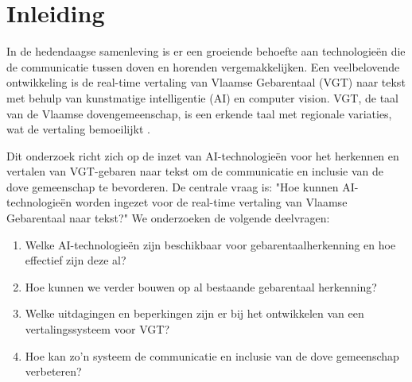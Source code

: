 


% 
\newcommand{\figref}[1]{(Zie \hyperref[#1]{figuur: \ref{#1}})}

\section{Inleiding}%
\label{sec:inleiding}

In de hedendaagse samenleving is er een groeiende behoefte aan technologieën die de communicatie tussen doven en horenden vergemakkelijken. Een veelbelovende ontwikkeling is de real-time vertaling van Vlaamse Gebarentaal (VGT) naar tekst met behulp van kunstmatige intelligentie (AI) en computer vision. VGT, de taal van de Vlaamse dovengemeenschap, is een erkende taal met regionale variaties, wat de vertaling bemoeilijkt \autocite{vanmeerbergen2000simultane}.

Dit onderzoek richt zich op de inzet van AI-technologieën voor het herkennen en vertalen van VGT-gebaren naar tekst om de communicatie en inclusie van de dove gemeenschap te bevorderen. De centrale vraag is: "Hoe kunnen AI-technologieën worden ingezet voor de real-time vertaling van Vlaamse Gebarentaal naar tekst?" We onderzoeken de volgende deelvragen:

\begin{enumerate} 
  \item Welke AI-technologieën zijn beschikbaar voor gebarentaalherkenning en hoe effectief zijn deze al? 
  \item Hoe kunnen we verder bouwen op al bestaande gebarentaal herkenning? 
  \item Welke uitdagingen en beperkingen zijn er bij het ontwikkelen van een vertalingssysteem voor VGT? 
  \item Hoe kan zo'n systeem de communicatie en inclusie van de dove gemeenschap verbeteren? 
\end{enumerate}


